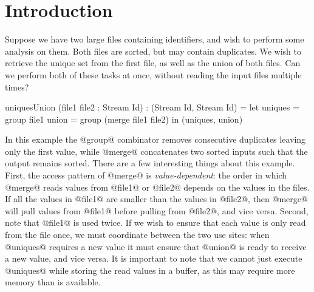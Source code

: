 \section{Introduction}
\label{s:Introduction}


Suppose we have two large files containing identifiers, and wish to perform some analysis on them.
Both files are sorted, but may contain duplicates.
We wish to retrieve the unique set from the first file, as well as the union of both files.
Can we perform both of these tasks at once, without reading the input files multiple times?

\begin{code}
uniquesUnion (file1 file2 : Stream Id) : (Stream Id, Stream Id)
 = let uniques = group file1
       union   = group (merge file1 file2)
   in (uniques, union)
\end{code}

In this example the @group@ combinator removes consecutive duplicates leaving only the first value, while @merge@ concatenates two sorted inputs such that the output remains sorted.
There are a few interesting things about this example.
First, the access pattern of @merge@ is \emph{value-dependent}: the order in which @merge@ reads values from @file1@ or @file2@ depends on the values in the files.
If all the values in @file1@ are smaller than the values in @file2@, then @merge@ will pull values from @file1@ before pulling from @file2@, and vice versa.
Second, note that @file1@ is used twice.
If we wish to ensure that each value is only read from the file once, we must coordinate between the two use sites: when @uniques@ requires a new value it must ensure that @union@ is ready to receive a new value, and vice versa.
It is important to note that we cannot just execute @uniques@ while storing the read values in a buffer, as this may require more memory than is available.


